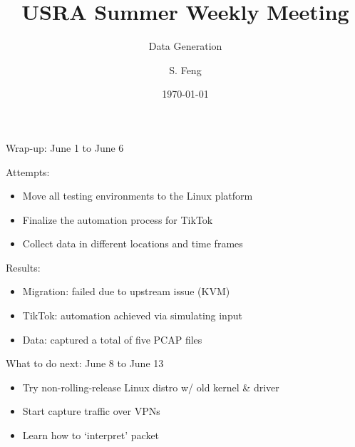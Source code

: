 \documentclass{beamer}
\title[Weekly Meeting]{
    USRA Summer Weekly Meeting
}
\subtitle[]{Data Generation}
\author[Shuo Feng]{S. Feng}
\institute[NIMS Lab]{
  NIMS Lab\\
  USRA Summer 2023}
\date{\today}
\begin{document}
\frame{\titlepage}

\begin{frame}{Wrap-up: June 1 to June 6}

  Attempts:
  \begin{itemize}
    \item Move all testing environments to the Linux platform
    \item Finalize the automation process for TikTok
    \item Collect data in different locations and time frames
  \end{itemize}

  Results:
  \begin{itemize}
    \item Migration: failed due to upstream issue (KVM)
    \item TikTok: automation achieved via simulating input
    \item Data: captured a total of five PCAP files
  \end{itemize}

\end{frame}

\begin{frame}{What to do next: June 8 to June 13}
  \begin{itemize}
    \item Try non-rolling-release Linux distro w/ old kernel \& driver
    \item Start capture traffic over VPNs
    \item Learn how to `interpret' packet
  \end{itemize}
\end{frame}
\end{document}

